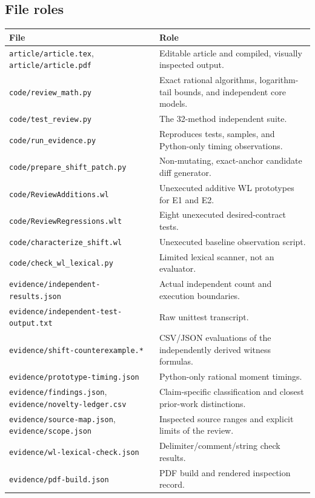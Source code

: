 \documentclass[11pt,letterpaper]{article}
\begin{document}
\subsection{File roles}
\begin{longtable}{@{}p{2.64in}p{3.9in}@{}}
\toprule
File & Role\\
\midrule
\endhead
\nolinkurl{article/article.tex}, \nolinkurl{article/article.pdf} & Editable article and compiled, visually inspected output.\\[4pt]
\nolinkurl{code/review_math.py} & Exact rational algorithms, logarithm-tail bounds, and independent core models.\\[4pt]
\nolinkurl{code/test_review.py} & The 32-method independent suite.\\[4pt]
\nolinkurl{code/run_evidence.py} & Reproduces tests, samples, and Python-only timing observations.\\[4pt]
\nolinkurl{code/prepare_shift_patch.py} & Non-mutating, exact-anchor candidate diff generator.\\[4pt]
\nolinkurl{code/ReviewAdditions.wl} & Unexecuted additive WL prototypes for E1 and E2.\\[4pt]
\nolinkurl{code/ReviewRegressions.wlt} & Eight unexecuted desired-contract tests.\\[4pt]
\nolinkurl{code/characterize_shift.wl} & Unexecuted baseline observation script.\\[4pt]
\nolinkurl{code/check_wl_lexical.py} & Limited lexical scanner, not an evaluator.\\[4pt]
\nolinkurl{evidence/independent-results.json} & Actual independent count and execution boundaries.\\[4pt]
\nolinkurl{evidence/independent-test-output.txt} & Raw unittest transcript.\\[4pt]
\nolinkurl{evidence/shift-counterexample.*} & CSV/JSON evaluations of the independently derived witness formulas.\\[4pt]
\nolinkurl{evidence/prototype-timing.json} & Python-only rational moment timings.\\[4pt]
\nolinkurl{evidence/findings.json}, \nolinkurl{evidence/novelty-ledger.csv} & Claim-specific classification and closest prior-work distinctions.\\[4pt]
\nolinkurl{evidence/source-map.json}, \nolinkurl{evidence/scope.json} & Inspected source ranges and explicit limits of the review.\\[4pt]
\nolinkurl{evidence/wl-lexical-check.json} & Delimiter/comment/string check results.\\[4pt]
\nolinkurl{evidence/pdf-build.json} & PDF build and rendered inspection record.\\
\bottomrule
\end{longtable}
\end{document}
